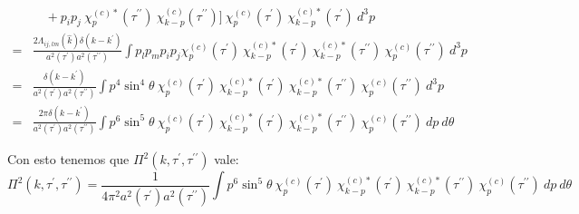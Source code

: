 \begin{equation*}
\begin{split}
        &\quad + p_i p_j ~ \chi^{(c) *}_{p} (\tau^{\prime \prime}) ~ \chi^{(c)}_{k - p} (\tau^{\prime \prime}) \Big] ~ \chi^{(c)}_{p} (\tau^\prime) ~ \chi_{k - p}^{(c) *} (\tau^\prime) ~ d^3 p\\
        =& \frac{2 \Lambda_{ij,lm} (\hat{k}) \delta \left( k - k^\prime \right)}{a^2 \left( \tau^\prime \right) a^2 \left( \tau^{\prime \prime} \right)} \int p_l p_m p_i p_j \chi^{(c)}_{p} (\tau^\prime) ~ \chi_{k - p}^{(c) *} (\tau^\prime) ~ \chi^{(c) *}_{k - p} (\tau^{\prime \prime}) ~ \chi^{(c)}_{p} (\tau^{\prime \prime}) ~ d^3 p\\
        =& \frac{\delta \left( k - k^\prime \right)}{a^2 \left( \tau^\prime \right) a^2 \left( \tau^{\prime \prime} \right)} \int p^4 \sin^4 \theta ~ \chi^{(c)}_{p} (\tau^\prime) ~ \chi_{k - p}^{(c) *} (\tau^\prime) ~ \chi^{(c) *}_{k - p} (\tau^{\prime \prime}) ~ \chi^{(c)}_{p} (\tau^{\prime \prime}) ~ d^3 p\\
        =& \frac{2\pi \delta \left( k - k^\prime \right)}{a^2 \left( \tau^\prime \right) a^2 \left( \tau^{\prime \prime} \right)} \int p^6 \sin^5 \theta ~ \chi^{(c)}_{p} (\tau^\prime) ~ \chi_{k - p}^{(c) *} (\tau^\prime) ~ \chi^{(c) *}_{k - p} (\tau^{\prime \prime}) ~ \chi^{(c)}_{p} (\tau^{\prime \prime}) ~ dp ~ d\theta
    \end{split}
\end{equation*}

Con esto tenemos que $\Pi^2 \left( k, \tau^\prime, \tau^{\prime \prime} \right)$ vale:
\begin{equation}
    \Pi^2 \left( k, \tau^\prime, \tau^{\prime \prime} \right) = \frac{1}{4 \pi^2 a^2 \left( \tau^\prime \right) a^2 \left( \tau^{\prime \prime} \right)} \int p^6 \sin^5 \theta ~ \chi^{(c)}_{p} (\tau^\prime) ~ \chi_{k - p}^{(c) *} (\tau^\prime) ~ \chi^{(c) *}_{k - p} (\tau^{\prime \prime}) ~ \chi^{(c)}_{p} (\tau^{\prime \prime}) ~ dp ~ d\theta
\end{equation}


